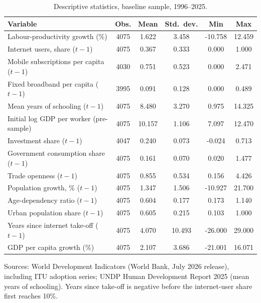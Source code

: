 \documentclass[preprint,12pt,authoryear]{elsarticle}
\begin{document}
\begin{table}[!ht]
\centering
\begin{threeparttable}
\caption{Descriptive statistics, baseline sample, 1996--2025.}\label{tab:desc}
\small
\begin{tabular}{lccccc}
\toprule
Variable & Obs. & Mean & Std.\ dev. & Min & Max\\
\midrule
Labour-productivity growth (\%) & 4075 & 1.622 & 3.458 & -10.758 & 12.459\\
Internet users, share ($t-1$) & 4075 & 0.367 & 0.333 & 0.000 & 1.000\\
Mobile subscriptions per capita ($t-1$) & 4030 & 0.751 & 0.523 & 0.000 & 2.471\\
Fixed broadband per capita ($t-1$) & 3995 & 0.091 & 0.128 & 0.000 & 0.489\\
Mean years of schooling ($t-1$) & 4075 & 8.480 & 3.270 & 0.975 & 14.325\\
Initial log GDP per worker (pre-sample) & 4075 & 10.157 & 1.106 & 7.097 & 12.470\\
Investment share ($t-1$) & 4047 & 0.240 & 0.073 & -0.024 & 0.713\\
Government consumption share ($t-1$) & 4075 & 0.161 & 0.070 & 0.020 & 1.477\\
Trade openness ($t-1$) & 4075 & 0.855 & 0.534 & 0.156 & 4.426\\
Population growth, \% ($t-1$) & 4075 & 1.347 & 1.506 & -10.927 & 21.700\\
Age-dependency ratio ($t-1$) & 4075 & 0.604 & 0.177 & 0.173 & 1.140\\
Urban population share ($t-1$) & 4075 & 0.605 & 0.215 & 0.103 & 1.000\\
Years since internet take-off ($t-1$) & 4075 & 4.070 & 10.493 & -26.000 & 29.000\\
GDP per capita growth (\%) & 4075 & 2.107 & 3.686 & -21.001 & 16.071\\
\bottomrule
\end{tabular}
\begin{tablenotes}\footnotesize
\item Sources: World Development Indicators (World Bank, July 2026 release), including ITU adoption series; UNDP Human Development Report 2025 (mean years of schooling). Years since take-off is negative before the internet-user share first reaches 10\%.
\end{tablenotes}
\end{threeparttable}
\end{table}
\end{document}
